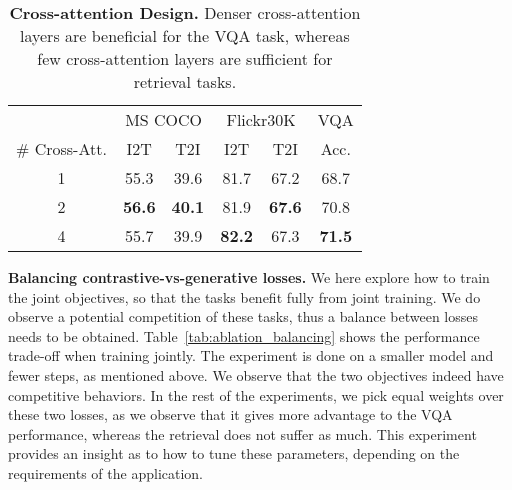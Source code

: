 \documentclass[10pt]{article} \usepackage[accepted]{tmlr}
\newcommand{\tablestyle}[2]{\setlength{\tabcolsep}{#1}\renewcommand{\arraystretch}{#2}\centering\footnotesize}
\begin{document}
\begin{table}\centering
\small
\tablestyle{8pt}{1.1}
\begin{tabular}{c|cc|cc|c}
& \multicolumn{2}{c|}{MS COCO} & \multicolumn{2}{c|}{Flickr30K} & \multicolumn{1}{c}{VQA} \\
\# Cross-Att. & I2T & T2I & I2T & T2I & Acc. \\ 
\hline
1 & 55.3 & 39.6 & 81.7 & 67.2  & 68.7 \\
2 &  \bf{56.6} & \bf{40.1} &81.9 & \bf{67.6}  & 70.8 \\
4 & 55.7 & 39.9 & \bf{82.2} & 67.3  & \bf{71.5} \\
\hline
\end{tabular}
\vspace{-1mm}
\caption{\textbf{Cross-attention Design.} Denser cross-attention layers are beneficial for the VQA task, whereas few cross-attention layers are sufficient for retrieval tasks.}
\label{tab:ablation_cross_att}
\vspace{-2mm}
\end{table}



\textbf{Balancing contrastive-vs-generative losses.}
We here explore how to train the joint objectives, so that the tasks benefit fully from joint training. We do observe a potential competition of these tasks, thus a balance between losses needs to be obtained.
Table~\ref{tab:ablation_balancing} shows the performance trade-off when training jointly. The experiment is done on a smaller model and fewer steps, as mentioned above.
We observe that the two objectives indeed have competitive behaviors. In the rest of the experiments, we pick equal weights over these two losses, as we observe that it gives more advantage to the VQA performance, whereas the retrieval does not suffer as much. This experiment provides an insight as to how to tune these parameters, depending on the requirements of the application.
\end{document}
